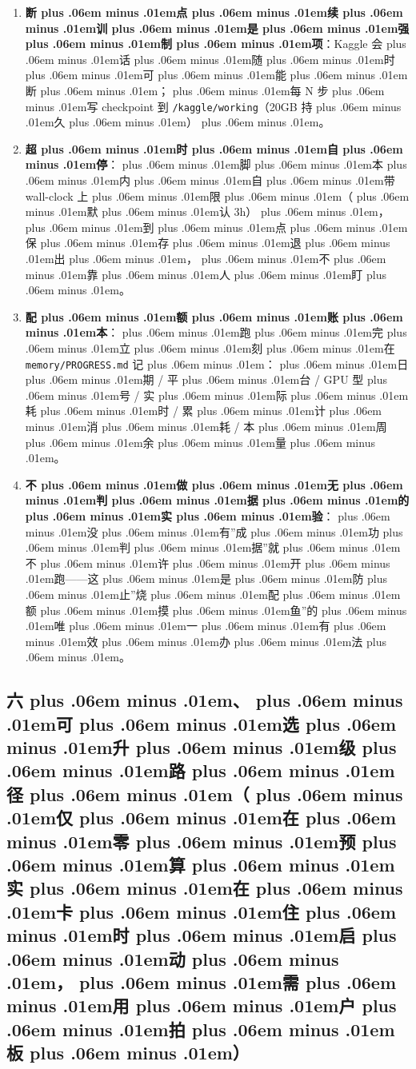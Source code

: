 \documentclass[
]{article}
\newcommand{\passthrough}[1]{#1}
\def\zh#1{{\zhfont #1}}
\def\zhglue{\hskip0pt plus .06em minus .01em}
\begin{document}
\begin{enumerate}
\item
  \textbf{\zh{断\zhglue 点\zhglue 续\zhglue 训\zhglue 是\zhglue 强\zhglue 制\zhglue 项}}\zh{：}Kaggle \zh{会\zhglue 话\zhglue 随\zhglue 时\zhglue 可\zhglue 能\zhglue 断\zhglue ；\zhglue 每} N \zh{步\zhglue 写} checkpoint \zh{到} \passthrough{\lstinline!/kaggle/working!}\zh{（}20GB \zh{持\zhglue 久\zhglue ）\zhglue 。}
\item
  \textbf{\zh{超\zhglue 时\zhglue 自\zhglue 停}}\zh{：\zhglue 脚\zhglue 本\zhglue 内\zhglue 自\zhglue 带} wall-clock \zh{上\zhglue 限\zhglue （\zhglue 默\zhglue 认} 3h\zh{）\zhglue ，\zhglue 到\zhglue 点\zhglue 保\zhglue 存\zhglue 退\zhglue 出\zhglue ，\zhglue 不\zhglue 靠\zhglue 人\zhglue 盯\zhglue 。}
\item
  \textbf{\zh{配\zhglue 额\zhglue 账\zhglue 本}}\zh{：\zhglue 跑\zhglue 完\zhglue 立\zhglue 刻\zhglue 在} \passthrough{\lstinline!memory/PROGRESS.md!} \zh{记\zhglue ：\zhglue 日\zhglue 期} / \zh{平\zhglue 台} / GPU \zh{型\zhglue 号} / \zh{实\zhglue 际\zhglue 耗\zhglue 时} / \zh{累\zhglue 计\zhglue 消\zhglue 耗} / \zh{本\zhglue 周\zhglue 余\zhglue 量\zhglue 。}
\item
  \textbf{\zh{不\zhglue 做\zhglue 无\zhglue 判\zhglue 据\zhglue 的\zhglue 实\zhglue 验}}\zh{：\zhglue 没\zhglue 有}''\zh{成\zhglue 功\zhglue 判\zhglue 据}''\zh{就\zhglue 不\zhglue 许\zhglue 开\zhglue 跑}------\zh{这\zhglue 是\zhglue 防\zhglue 止}''\zh{烧\zhglue 配\zhglue 额\zhglue 摸\zhglue 鱼}''\zh{的\zhglue 唯\zhglue 一\zhglue 有\zhglue 效\zhglue 办\zhglue 法\zhglue 。}
\end{enumerate}

\subsection{\zh{六\zhglue 、\zhglue 可\zhglue 选\zhglue 升\zhglue 级\zhglue 路\zhglue 径\zhglue （\zhglue 仅\zhglue 在\zhglue 零\zhglue 预\zhglue 算\zhglue 实\zhglue 在\zhglue 卡\zhglue 住\zhglue 时\zhglue 启\zhglue 动\zhglue ，\zhglue 需\zhglue 用\zhglue 户\zhglue 拍\zhglue 板\zhglue ）}}\label{ux516dux53efux9009ux5347ux7ea7ux8defux5f84ux4ec5ux5728ux96f6ux9884ux7b97ux5b9eux5728ux5361ux4f4fux65f6ux542fux52a8ux9700ux7528ux6237ux62cdux677f}
\end{document}
